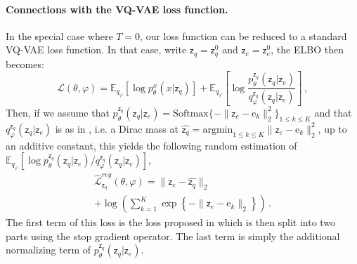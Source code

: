 \documentclass[nohyperref]{article}
\theoremstyle{plain}
\theoremstyle{definition}
\theoremstyle{remark}
\newcommand{\latentcont}{\mathsf{z}_e}
\newcommand{\latentdis}{\mathsf{z}_q}
\newcommand{\rme}{\mathrm{e}}
\newcommand{\embed}{\rme}
\begin{document}


\paragraph{Connections with the VQ-VAE loss function. } In the special case where $T=0$, our loss function can be reduced to a standard VQ-VAE loss function. In that case, write $\latentdis = \latentdis^0$ and $\latentcont = \latentcont^0$, the ELBO then becomes: 
$$
\mathcal{L}(\theta,\varphi) = \mathbb{E}_{q_{\varphi}}\left[\log p^x_{\theta}(x|\latentdis)\right]
+ \mathbb{E}_{q_{\varphi}}\left[\log \frac{p_{\theta}^{\latentdis}(\latentdis|\latentcont)}{q_{\varphi}^{\latentdis}(\latentdis|\latentcont)}\right]\,, 
$$
Then, if we assume that $p_{\theta}^{\latentdis}(\latentdis|\latentcont) = \mathrm{Softmax}\{-\|\latentcont - \embed_k\|^2_2\}_{1\leq k \leq K}$ and that  $q_{\varphi}^{\latentdis}(\latentdis|\latentcont)$ is as in \cite{oord2017neural}, i.e. a Dirac mass at $\widehat{\latentdis} = \mathrm{argmin}_{1\leq k \leq K}\|\latentcont - \embed_k\|^2_2$, up to an additive constant, this yields the following random estimation of $\mathbb{E}_{q_{\varphi}}[\log p_{\theta}^{\latentdis}(\latentdis|\latentcont)/q_{\varphi}^{\latentdis}(\latentdis|\latentcont)]$,
\begin{multline*}
    \widehat{\mathcal{L}}^{reg}_{\latentdis}(\theta,\varphi) = \|\latentcont - \widehat{\latentdis}\|_2 \\+ \log \left(\sum_{k=1}^{K}\exp\left\{-\|\latentcont-\embed_k\|_2\right\}\right)\,.
\end{multline*}
The first term of this loss is the loss proposed in \cite{oord2017neural} which is then split into two parts using the stop gradient operator. The last term is simply the additional normalizing term of  $p_{\theta}^{\latentdis}(\latentdis|\latentcont)$. %
\end{document}

